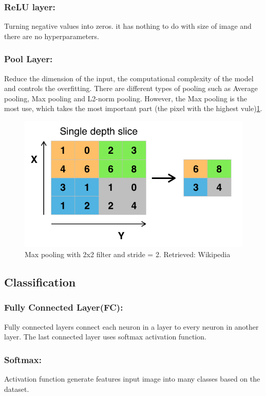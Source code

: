 \documentclass[12pt]{report}
\begin{document}
\subsubsection{ReLU layer:}
Turning negative values into zeros. it has nothing to do with 
size of image and there are no hyperparameters.
\subsubsection{Pool Layer:}
Reduce the dimension of the input, the computational complexity of 
the model and controls the overfitting. There are different types of
pooling such as Average pooling, Max pooling and L2-norm pooling.
However, the Max pooling is the most use, which takes the most important
part (the pixel with the highest vule)\ref{fig:pool}. 

\begin{figure}[h]
    \centering
    \includegraphics[width=.8\textwidth]{./images/pool.png}
    \caption{Max pooling with 2x2 filter and stride = 2. Retrieved: Wikipedia}
    \label{fig:pool}
\end{figure}

\subsection{Classification}
\subsubsection{Fully Connected Layer(FC):}
Fully connected layers connect each neuron in a layer to every neuron 
in another layer. The last connected layer uses softmax activation function.
\subsubsection{Softmax:}
Activation function generate features input image into many 
classes based on the dataset.  
\end{document}
